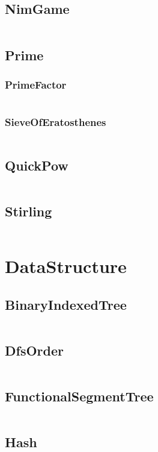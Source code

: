 \documentclass[a4paper,11pt]{article}
\begin{document}
\subsection{NimGame}
\inputminted[breaklines]{c++}{02++Math/+NimGame.cpp}
\subsection{Prime}
\subsubsection{PrimeFactor}
\inputminted[breaklines]{c++}{02++Math/+Prime/+PrimeFactor.cpp}
\subsubsection{SieveOfEratosthenes}
\inputminted[breaklines]{c++}{02++Math/+Prime/+SieveOfEratosthenes.cpp}

\subsection{QuickPow}
\inputminted[breaklines]{c++}{02++Math/+QuickPow.cpp}
\subsection{Stirling}
\inputminted[breaklines]{c++}{02++Math/+Stirling.cpp}

\newpage
\section{DataStructure}
\subsection{BinaryIndexedTree}
\inputminted[breaklines]{c++}{03++DataStructure/+BinaryIndexedTree.cpp}
\subsection{DfsOrder}
\inputminted[breaklines]{c++}{03++DataStructure/+DfsOrder.cpp}
\subsection{FunctionalSegmentTree}
\inputminted[breaklines]{c++}{03++DataStructure/+FunctionalSegmentTree.cpp}
\subsection{Hash}
\inputminted[breaklines]{c++}{03++DataStructure/+Hash.cpp}
\end{document}
